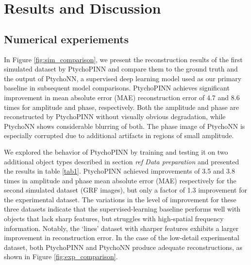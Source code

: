 \documentclass[sn-mathphys]{sn-jnl}%
\theoremstyle{thmstyleone}%
\theoremstyle{thmstyletwo}%
\theoremstyle{thmstylethree}%
\begin{document}

\section{Results and Discussion}

\subsection{Numerical experiements}

In Figure \ref{fig:sim_comparison}, we present the reconstruction results of the first simulated dataset by PtychoPINN and compare them to the ground truth and the output of PtychoNN, a supervised deep learning model used as our primary baseline in subsequent model comparisons. PtychoPINN achieves significant improvement in mean absolute error (MAE) reconstruction error of 4.7 and 8.6 times for amplitude and phase, respectively. Both the amplitude and phase are reconstructed by PtychoPINN without visually obvious degradation, while PtychoNN shows considerable blurring of both. The phase image of PtychoNN is especially corrupted due to additional artifacts in regions of small amplitude.


We explored the behavior of PtychoPINN by training and testing it on two additional object types described in section \emph{ref Data preparation} and presented the results in table \ref{tab1}. PtychoPINN achieved improvements of 3.5 and 3.8 times in amplitude and phase mean absolute error (MAE) respectively for the second simulated dataset (GRF images), but only a factor of 1.3 improvement for the experimental dataset. The variations in the level of improvement for these three datasets indicate that the supervised-learning baseline performs well with objects that lack sharp features, but struggles with high-spatial frequency information. Notably, the `lines' dataset with sharper features exhibits a larger improvement in reconstruction error. In the case of the low-detail experimental dataset, both PtychoPINN and PtychoNN produce adequate reconstructions, as shown in Figure \ref{fig:exp_comparison}.
\end{document}
